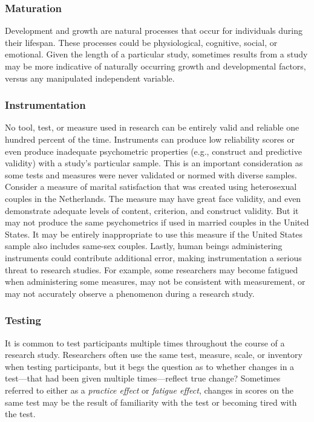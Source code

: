 \documentclass[
  11pt,
]{book}
\begin{document}
\subsubsection{Maturation}\label{maturation}

Development and growth are natural processes that occur for individuals during their lifespan. These processes could be physiological, cognitive, social, or emotional. Given the length of a particular study, sometimes results from a study may be more indicative of naturally occurring growth and developmental factors, versus any manipulated independent variable.

\subsubsection{Instrumentation}\label{instrumentation}

No tool, test, or measure used in research can be entirely valid and reliable one hundred percent of the time. Instruments can produce low reliability scores or even produce inadequate psychometric properties (e.g., construct and predictive validity) with a study's particular sample. This is an important consideration as some tests and measures were never validated or normed with diverse samples. Consider a measure of marital satisfaction that was created using heterosexual couples in the Netherlands. The measure may have great face validity, and even demonstrate adequate levels of content, criterion, and construct validity. But it may not produce the same psychometrics if used in married couples in the United States. It may be entirely inappropriate to use this measure if the United States sample also includes same-sex couples. Lastly, human beings administering instruments could contribute additional error, making instrumentation a serious threat to research studies. For example, some researchers may become fatigued when administering some measures, may not be consistent with measurement, or may not accurately observe a phenomenon during a research study.

\subsubsection{Testing}\label{testing}

It is common to test participants multiple times throughout the course of a research study. Researchers often use the same test, measure, scale, or inventory when testing participants, but it begs the question as to whether changes in a test---that had been given multiple times---reflect true change? Sometimes referred to either as a \emph{practice effect} or \emph{fatigue effect}, changes in scores on the same test may be the result of familiarity with the test or becoming tired with the test.
\end{document}
